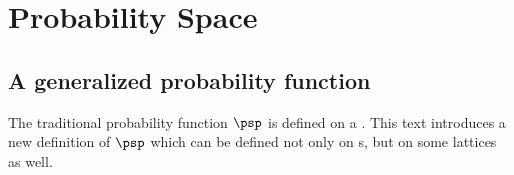 \chapter{Probability Space}
\label{chp:prbspace}
\section{A generalized probability function}
The traditional probability function $\psp$ is defined on a .
This text introduces a new definition of $\psp$ which can be defined not only on 
s, but on some  lattices as well.

